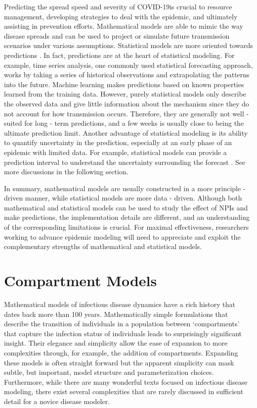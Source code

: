 \documentclass[]{book}
\begin{document}
Predicting the spread speed and severity of COVID-19is crucial to
resource management, developing strategies to deal with the epidemic,
and ultimately assisting in prevention efforts. Mathematical models are
able to mimic the way disease spreads and can be used to project or
simulate future transmission scenarios under various assumptions.
Statistical models are more oriented towards predictions
\citep{Held:etal:20}. In fact, predictions are at the heart of
statistical modeling. For example, time series analysis, one commonly
used statistical forecasting approach, works by taking a series of
historical observations and extrapolating the patterns into the future.
Machine learning makes predictions based on known properties learned
from the training data. However, purely statistical models only describe
the observed data and give little information about the mechanism since
they do not account for how transmission occurs. Therefore, they are
generally not well - suited for long - term predictions, and a few weeks
is usually close to being the ultimate prediction limit. Another
advantage of statistical modeling is its ability to quantify uncertainty
in the prediction, especially at an early phase of an epidemic with
limited data. For example, statistical models can provide a prediction
interval to understand the uncertainty surrounding the forecast
\citep{brockwell2002introduction}. See more discussions in the following
section.

In summary, mathematical models are usually constructed in a more
principle - driven manner, while statistical models are more data -
driven. Although both mathematical and statistical models can be used to
study the effect of NPIs and make predictions, the implementation
details are different, and an understanding of the corresponding
limitations is crucial. For maximal effectiveness, researchers working
to advance epidemic modeling will need to appreciate and exploit the
complementary strengths of mathematical and statistical models.

\section{Compartment Models}\label{compartment-models}

Mathematical models of infectious disease dynamics have a rich history
that dates back more than 100 years. Mathematically simple formulations
that describe the transition of individuals in a population between
`compartments' that capture the infection status of individuals leads to
surprisingly significant insight. Their elegance and simplicity allow
the ease of expansion to more complexities through, for example, the
addition of compartments. Expanding these models is often straight
forward but the apparent simplicity can mask subtle, but important,
model structure and parameterization choices. Furthermore, while there
are many wonderful texts focused on infectious disease modeling, there
exist several complexities that are rarely discussed in sufficient
detail for a novice disease modeler.
\end{document}
